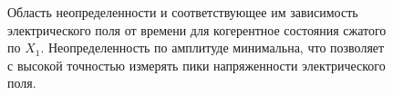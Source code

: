 \begin{figure}
\centering



\caption{Область неопределенности и соответствующее им зависимость
  электрического поля от времени для когерентное состояния сжатого по
  $X_1$. Неопределенность по амплитуде минимальна, что позволяет с
  высокой точностью измерять пики напряженности электрического поля.} 
\label{figPart3Squeezed_2}
\end{figure}
